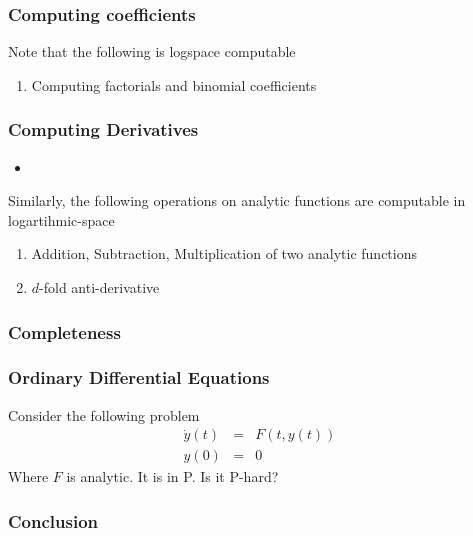 \documentclass[xcolor=pdftex,dvipsnames,table]{beamer}
\begin{document}
\begin{frame}
\frametitle{Computing coefficients}
Note that the following is logspace computable
\begin{enumerate}
  \item Computing factorials and binomial coefficients
\end{enumerate}

\end{frame}
\begin{frame}
\frametitle{Computing Derivatives}
\begin{itemize}
\item 
\end{itemize}
  Similarly, the following operations on analytic functions are computable in logartihmic-space
  \begin{enumerate}
    \item Addition, Subtraction, Multiplication of two analytic functions
     \item $d$-fold anti-derivative
   \end{enumerate}
\end{frame}
\begin{frame}
  \frametitle{Completeness}
 \end{frame}
\begin{frame}
  \frametitle{Ordinary Differential Equations}
  Consider the following problem
\begin{eqnarray*}
  \dot y(t) &=& F(t, y(t)) \\
  y(0) &=& 0 
\end{eqnarray*}
Where $F$ is analytic.
It is in P. Is it P-hard?
 \end{frame}
\begin{frame}
  \frametitle{Conclusion}
\end{frame}
\end{document}

